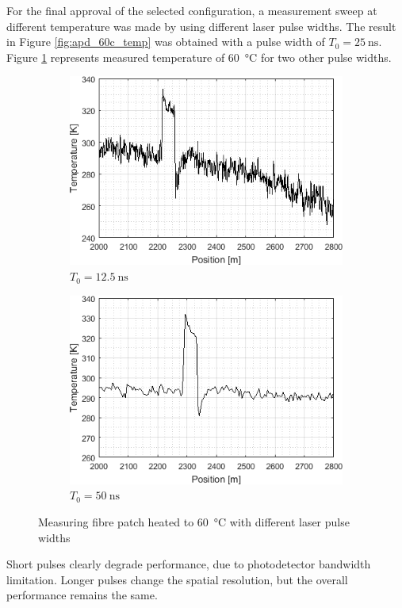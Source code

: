 \documentclass{standalone}
\begin{document}
For the final approval of the selected configuration, a measurement sweep at different temperature was made by using different laser pulse widths. The result in Figure \ref{fig:apd_60c_temp} was obtained with a pulse width of $T_0 = \SI{25}{\nano \second}$. Figure \ref{fig:width_sweep_60c} represents measured temperature of \SI{60}{\celsius} for two other pulse widths.
\begin{figure}[h]
	\centering
	\begin{subfigure}[b]{0.49\textwidth}
		\includegraphics[width=\textwidth]{width_sweep_60c_12ns.png}
		\caption{$T_0 = \SI{12.5}{\nano \second}$}
	\end{subfigure}
	\begin{subfigure}[b]{0.49\textwidth}
		\includegraphics[width=\textwidth]{width_sweep_60c_50ns.png}
		\caption{$T_0 = \SI{50}{\nano \second}$}
	\end{subfigure}
	\caption{Measuring fibre patch heated to \SI{60}{\celsius} with different laser pulse widths}
	\label{fig:width_sweep_60c}
\end{figure}
Short pulses clearly degrade performance, due to photodetector bandwidth limitation. Longer pulses change the spatial resolution, but the overall performance remains the same. \\
\end{document}
